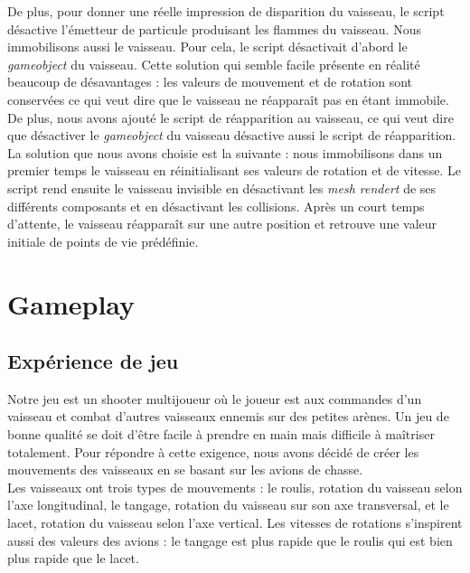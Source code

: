 \documentclass[12pt, titlepage]{article}
\begin{document}
\begin{spacing}{1.5}
De plus, pour donner une réelle impression de disparition du vaisseau, le script désactive l'émetteur de particule produisant les flammes du vaisseau. Nous immobilisons aussi le vaisseau. Pour cela, le script désactivait d'abord le \textit{gameobject} du vaisseau. Cette solution qui semble facile présente en réalité beaucoup de désavantages : les valeurs de mouvement et de rotation sont conservées ce qui veut dire que le vaisseau ne réapparaît pas en étant immobile. De plus, nous avons ajouté le script de réapparition au vaisseau, ce qui veut dire que désactiver le \textit{gameobject} du vaisseau désactive aussi le script de réapparition.\\
 
 La solution que nous avons choisie est la suivante : nous immobilisons dans un premier temps le vaisseau en réinitialisant ses valeurs de rotation et de vitesse. Le script  rend ensuite le vaisseau invisible en désactivant les \textit{mesh rendert} de ses différents composants et en désactivant les collisions. Après un court temps d'attente, le vaisseau réapparaît sur une autre position et retrouve une valeur initiale de points de vie prédéfinie.\\

\newpage
\section{Gameplay}

\subsection{Expérience de jeu}

Notre jeu est un shooter multijoueur où le joueur est aux commandes d'un vaisseau et combat d'autres vaisseaux ennemis sur des petites arènes. Un jeu de bonne qualité se doit d'être facile à prendre en main mais difficile à maîtriser totalement. Pour répondre à cette exigence, nous avons décidé de créer les mouvements des vaisseaux en se basant sur les avions de chasse.\\

Les vaisseaux ont trois types de mouvements : le roulis, rotation du vaisseau selon l'axe longitudinal, le tangage, rotation du vaisseau sur son axe transversal, et le lacet, rotation du vaisseau selon l'axe vertical. Les vitesses de rotations s'inspirent aussi des valeurs des avions : le tangage est plus rapide que le roulis qui est bien plus rapide que le lacet. \\


\end{spacing}
\end{document}
